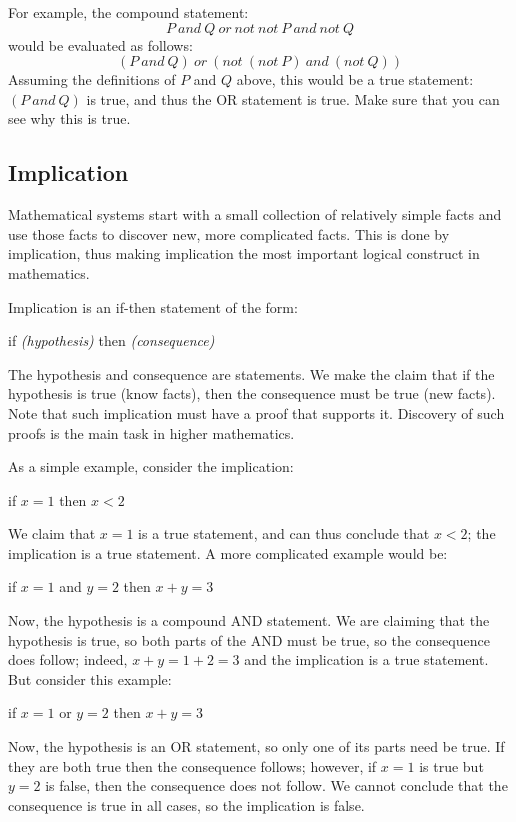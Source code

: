 \documentclass[letterpaper,12pt,fleqn]{article}
\begin{document}
For example, the compound statement:
\[P\ and\ Q\ or\ not\ not\ P\ and\ not\ Q\]
would be evaluated as follows:
\[(P\ and\ Q)\ or\ (not\ (not\ P)\ and\ (not\ Q))\]
Assuming the definitions of $P$ and $Q$ above, this would be a true statement:
$(P\ and\ Q)$ is true, and thus the OR statement is true. Make sure that you
can see why this is true.

\subsection*{Implication}

Mathematical systems start with a small collection of relatively simple facts
and use those facts to discover new, more complicated facts. This is done by
implication, thus making implication the most important logical construct in
mathematics.

\newpage

Implication is an if-then statement of the form:

\hspace{0.5in}if \emph{(hypothesis)} then \emph{(consequence)}

The hypothesis and consequence are statements. We make the claim that if the
hypothesis is true (know facts), then the consequence must be true (new
facts). Note that such implication must have a proof that supports it.
Discovery of such proofs is the main task in higher mathematics.

As a simple example, consider the implication:

\hspace{0.5in}if $x=1$ then $x<2$

We claim that $x=1$ is a true statement, and can thus conclude that $x<2$; the
implication is a true statement. A more complicated example would be:

\hspace{0.5in}if $x=1$ and $y=2$ then $x+y=3$

Now, the hypothesis is a compound AND statement. We are claiming that the
hypothesis is true, so both parts of the AND must be true, so the consequence
does follow; indeed, $x+y=1+2=3$ and the implication is a true statement. But
consider this example:

\hspace{0.5in}if $x=1$ or $y=2$ then $x+y=3$

Now, the hypothesis is an OR statement, so only one of its parts need be true.
If they are both true then the consequence follows; however, if $x=1$ is true
but $y=2$ is false, then the consequence does not follow. We cannot conclude
that the consequence is true in all cases, so the implication is false.
\end{document}
